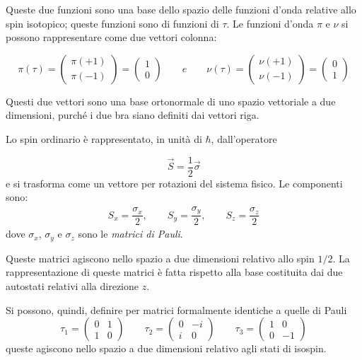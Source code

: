 Queste due funzioni sono una base dello spazio delle funzioni d'onda relative
allo spin isotopico; queste funzioni sono di funzioni di $\tau$. Le funzioni
d'onda $\pi$ e $\nu$ si possono rappresentare come due vettori colonna:

\begin{equation*}
\pi(\tau) =
\begin{pmatrix}
\pi(+1) \\
\pi(-1)
\end{pmatrix} =
\begin{pmatrix}
1 \\
0
\end{pmatrix} 
\qquad e \qquad
\nu(\tau) = 
\begin{pmatrix}
\nu(+1) \\
\nu(-1)
\end{pmatrix} =
\begin{pmatrix}
0 \\
1
\end{pmatrix} 
\end{equation*}

Questi due vettori sono una base ortonormale di uno spazio vettoriale a due
dimensioni, purché i due bra siano definiti dai vettori riga.
\breaknote

Lo  spin ordinario è rappresentato, in unità di 
$\hbar$, dall'operatore

\begin{equation}
\vec{S}=\dfrac{1}{2} \vec{\sigma}
\end{equation}
e si trasforma come un vettore per rotazioni del sistema fisico. Le componenti 
sono:
\begin{align*}
  S_{x} = \dfrac{\sigma_{x}}{2}, \qquad S_{y} =\dfrac{\sigma_y}{2}, \qquad 
S_{z}=\dfrac{\sigma_z}{2}
\end{align*}
dove $\sigma_{x}$, $\sigma_{y}$ e $\sigma_{z}$ sono le \textit{matrici di 
Pauli}. 

Queste matrici agiscono nello spazio a due dimensioni relativo allo spin $1/2$.
La rappresentazione di queste matrici è fatta rispetto alla base costituita dai
due autostati relativi alla direzione $z$. 

Si possono, quindi, definire per matrici formalmente identiche a quelle di Pauli
\begin{equation*}
\tau_{1}=
\begin{pmatrix}
0 & 1 \\
1 & 0
\end{pmatrix}
\qquad
\tau_{2}=
\begin{pmatrix}
0 & -i \\
i & 0
\end{pmatrix}
\qquad
\tau_{3}=
\begin{pmatrix}
1 & 0 \\
0 & -1
\end{pmatrix}
\end{equation*}
queste agiscono nello spazio a due dimensioni relativo agli stati di isospin.

